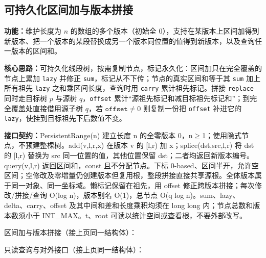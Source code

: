 

\subsection{可持久化区间加与版本拼接}\label{compact-PersistentRange}

\noindent\textbf{功能：}\allowbreak 维护长度为 $n$ 的数组的多个版本（初始全 0），支持在某版本上区间加得到新版本、把一个版本的某段替换成另一个版本同位置的值得到新版本，以及查询任一版本的区间和。

\textbf{核心思路：}\allowbreak 可持久化线段树，按需复制节点，标记永久化：区间加只在完全覆盖的节点上累加 \texttt{lazy} 并修正 \texttt{sum}，标记从不下传；节点的真实区间和等于其 \texttt{sum} 加上所有祖先 \texttt{lazy} 之和乘区间长度，查询时用 \texttt{carry} 累计祖先标记。拼接 \texttt{replace} 同时走目标树 $p$ 与源树 $q$，\texttt{offset} 累计“源祖先标记和减目标祖先标记和”；到完全覆盖处直接借用源子树 $q$，若 $\texttt{offset}\ne0$ 则复制一份把 \texttt{offset} 补进它的 \texttt{lazy}，使挂到目标祖先下后数值不变。



{\sloppy{}\noindent\textbf{接口契约：}PersistentRange(n) 建立长度 n 的全零版本 0，n$\ge$1；使用隐式节点，不预建整棵树。add(v,l,r,x) 在版本 v 的 [l,r) 加 x；splice(dst,src,l,r) 将 dst 的 [l,r) 替换为 src 同一位置的值，其他位置保留 dst；二者均返回新版本编号。query(v,l,r) 返回区间和，const 且不分配节点。下标 0-based、区间半开，允许空区间；空修改及零增量仍创建版本但复用根，整段拼接直接共享源根。全体版本属于同一对象、同一坐标域。懒标记保留在祖先，用 offset 修正跨版本拼接；每次修改/拼接/查询 O(log n)，版本别名 O(1)，总节点 O(q log n)。sum、lazy、delta、carry、offset 及其中间和差和长度乘积均须在 long long 内；节点总数和版本数须小于 INT\_MAX。t、root 可读以统计空间或查看根，不要外部改写。\par}

\Needspace{400pt}



\newpage

\noindent 区间加与版本拼接（接上页同一结构体）：



\newpage

\noindent 只读查询与对外接口（接上页同一结构体）：



